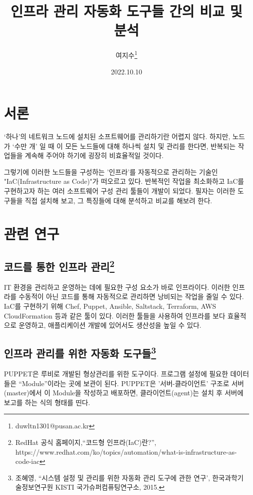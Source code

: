 \documentclass[11pt, a4paper]{article}
\begin{document}
\title{인프라 관리 자동화 도구들 간의 비교 및 분석}
\author{여지수\footnote{duwltn1301@pusan.ac.kr}}
\date{2022.10.10}
\maketitle

\section{서론}
‘하나’의 네트워크 노드에 설치된 소프트웨어를 관리하기란 어렵지 않다. 
하지만, 노드가 ‘수만 개’ 일 때 이 모든 노드들에 대해 하나씩 설치 및 관리를 한다면, 반복되는 작업들을 계속해 주어야 하기에 굉장히 비효율적일 것이다. 

그렇기에 이러한 노드들을 구성하는 '인프라'를 자동적으로 관리하는 기술인 "IaC(Infrastructure as Code)"가 떠오르고 있다. 
반복적인 작업을 최소화하고 IaC를 구현하고자 하는 여러 소프트웨어 구성 관리 툴들이 개발이 되었다. 
필자는 이러한 도구들을 직접 설치해 보고, 그 특징들에 대해 분석하고 비교를 해보려 한다.

\section{관련 연구}
\subsection{코드를 통한 인프라 관리\protect\footnote{RedHat 공식 홈페이지,``코드형 인프라(IaC)란?'',
https://www.redhat.com/ko/topics/automation/what-is-infrastructure-as-code-iac}}

IT 환경을 관리하고 운영하는 데에 필요한 구성 요소가 바로 인프라이다. 
이러한 인프라를 수동적이 아닌 코드를 통해 자동적으로 관리하면 낭비되는 작업을 줄일 수 있다. 
IaC를 구현하기 위해 Chef, Puppet, Ansible, Saltstack, Terraform, AWS CloudFormation 등과 같은 툴이 있다. 
이러한 툴들을 사용하여 인프라를 보다 효율적으로 운영하고, 애플리케이션 개발에 있어서도 생산성을 높일 수 있다. 

\subsection{인프라 관리를 위한 자동화 도구들\protect\footnote{조혜영, ``시스템 설정 및 관리를 위한 자동화 관리 도구에 관한 연구', 한국과학기술정보연구원 KISTI 국가슈퍼컴퓨팅연구소, 2015.}}

PUPPET은 루비로 개발된 형상관리를 위한 도구이다. 
프로그램 설정에 필요한 데이터들은 “Module”이라는 곳에 보관이 된다. 
PUPPET은 ’서버-클라이언트’ 구조로 서버(master)에서 이 Module을 작성하고 배포하면, 클라이언트(agent)는 설치 후 서버에 보고를 하는 식의 형태를 띤다. 
\end{document}
